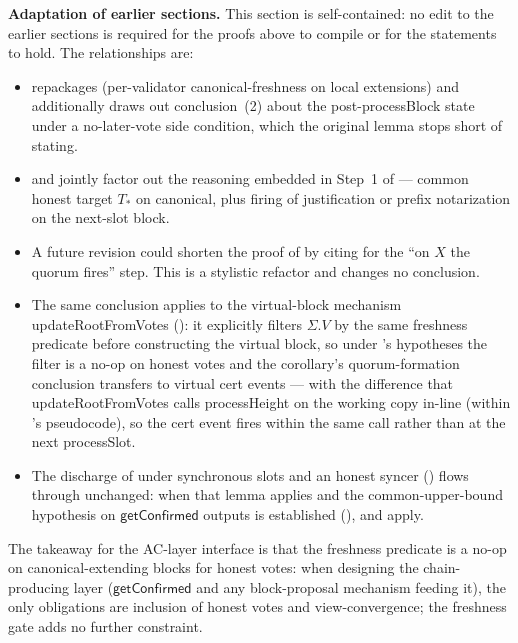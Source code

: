 \documentclass{article}
\newcommand{\processSlot}{\textsf{processSlot}\xspace}
\newcommand{\processBlock}{\textsf{processBlock}\xspace}
\newcommand{\processHeight}{\textsf{processHeight}\xspace}
\newcommand{\updateRootFromVotes}{\textsf{updateRootFromVotes}\xspace}
\newcommand{\getConfirmed}{\textsf{getConfirmed}\xspace}
\renewcommand{\paragraph}[1]{\vspace{7pt}\noindent\textbf{#1}}
\theoremstyle{plain}
\theoremstyle{definition}
\theoremstyle{remark}
\begin{document}
\paragraph{Adaptation of earlier sections.}
This section is self-contained: no edit to the earlier sections is required for the proofs above to compile or for the statements to hold.
The relationships are:
\begin{itemize}
  \item {} repackages  (per-validator canonical-freshness on local extensions) and additionally draws out conclusion~(2) about the post-\processBlock state under a no-later-vote side condition, which the original lemma stops short of stating.
  \item {} and  jointly factor out the reasoning embedded in Step~1 of  --- common honest target $T_\ast$ on canonical, plus firing of justification or prefix notarization on the next-slot block.
  \item A future revision could shorten the proof of  by citing  for the ``on $X$ the quorum fires'' step. This is a stylistic refactor and changes no conclusion.
  \item The same conclusion applies to the virtual-block mechanism \updateRootFromVotes{} (): it explicitly filters $\Sigma.V$ by the same freshness predicate before constructing the virtual block, so under 's hypotheses the filter is a no-op on honest votes and the corollary's quorum-formation conclusion transfers to virtual cert events --- with the difference that \updateRootFromVotes{} calls \processHeight on the working copy in-line (within 's pseudocode), so the cert event fires within the same call rather than at the next \processSlot.
  \item The discharge of  under synchronous slots and an honest syncer () flows through unchanged: when that lemma applies and the common-upper-bound hypothesis on $\getConfirmed$ outputs is established (),  and  apply.
\end{itemize}
The takeaway for the AC-layer interface is that the freshness predicate is a no-op on canonical-extending blocks for honest votes: when designing the chain-producing layer ($\getConfirmed$ and any block-proposal mechanism feeding it), the only obligations are inclusion of honest votes and view-convergence; the freshness gate adds no further constraint.
\end{document}
